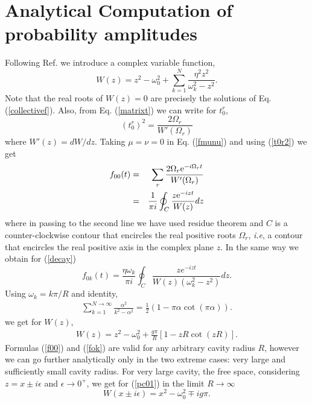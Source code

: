 \documentclass[10pt,english,twocolumn]{revtex4}
\begin{document}
\section{Analytical Computation of probability amplitudes}
Following Ref. \cite{gabrielsolo}
we introduce a complex variable function,
%
\begin{equation}
W(z)=z^2-\omega_0^2+\sum_{k=1}^N\frac{\eta^2 z^2}{\omega_k^2-z^2}.
\label{function}
\end{equation}
%
Note that the real roots of $W(z)=0$ are precisely the solutions of Eq. (\ref{collectivef}). Also, from Eq. (\ref{matrixt}) we can
write for $t_0^r$,
%
\begin{equation}
(t_0^r)^2=\frac{2\Omega_r}{W'(\Omega_r)}
\label{t0r2}
\end{equation}
where $W'(z)=dW/dz$. Taking $\mu=\nu=0$  in Eq. (\ref{fmunu}) and using (\ref{t0r2}) we get
%
\begin{eqnarray}
f_{00}(t)&=&\sum_{r}\frac{2\Omega_r{\rm e}^{-i\Omega_r t}}{W'(\Omega_r)}\nonumber\\
&=&\frac{1}{\pi i}\oint_C\frac{z{\rm e}^{-izt}}{W(z)} dz
\label{f00}
\end{eqnarray}
%
where in passing to the second line we have used residue theorem and $C$ is a counter-clockwise contour that encircles the real
positive roots $\Omega_r$, {\it i.e}, a contour that encircles the real positive axis in the complex plane $z$.
In the same way we obtain for (\ref{decay})
%
\begin{equation}
f_{0k}(t)=\frac{\eta\omega_k}{\pi i}\oint_C\frac{ze^{-izt}}{W(z)(\omega_k^2-z^2)}dz.
\label{fok}
\end{equation}
%
Using  $\omega_k=k\pi/R$ and identity,
%
\begin{eqnarray}
\sum_{k=1}^{N\to\infty}\frac{\alpha^2}{k^2-\alpha^2}=\frac{1}{2}(1-\pi\alpha\cot(\pi \alpha)).
\label{formula}
\end{eqnarray}
%
we get for  $W(z)$,
%
\begin{eqnarray}
\label{pc01}
W(z)=z^2-\omega_0^2+\frac{g\pi}{R}[1-zR\cot(zR)].
\end{eqnarray}
%
 Formulas (\ref{f00}) and (\ref{fok}) are valid for
any arbitrary cavity radius $R$, however we can go further analytically only in the two extreme cases: very large and
sufficiently small cavity radius.
For very large cavity, the free space,  considering $z=x\pm i\epsilon$ and $\epsilon\to 0^+$, we get for
(\ref{pc01}) in the limit $R\to\infty$
%
\begin{equation} 
W(x\pm i\epsilon) = x^2-\omega_0^2\mp ig\pi.
\label{wrtoinfty}
\end{equation}
\end{document}
